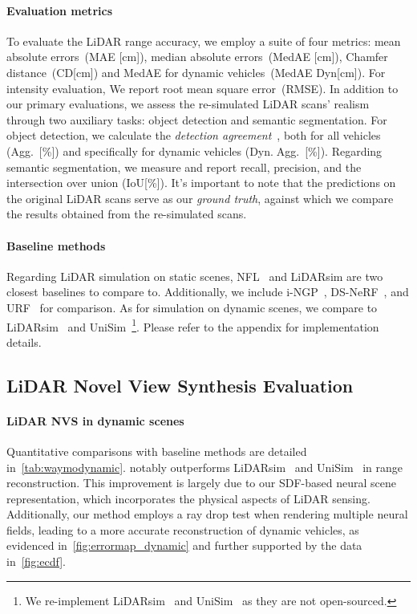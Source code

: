 \paragraph{Evaluation metrics}\label{sec:metrics}
To evaluate the LiDAR range accuracy, we employ a suite of four metrics: mean absolute errors~(MAE [cm]), median absolute errors~(MedAE [cm]), Chamfer distance~(CD[cm]) and MedAE for dynamic vehicles~(MedAE Dyn[cm]). For intensity evaluation, We report root mean square error~(RMSE).
%
In addition to our primary evaluations, we assess the re-simulated LiDAR scans' realism through two auxiliary tasks: object detection and semantic segmentation. For object detection, we calculate the \textit{detection agreement}~\cite{manivasagam2020lidarsim}, both for all vehicles (Agg.~[\%]) and specifically for dynamic vehicles (Dyn.$\;$Agg.~[\%]). Regarding semantic segmentation, we measure and report recall, precision, and the intersection over union (IoU[\%]). It's important to note that the predictions on the original LiDAR scans serve as our \textit{ground truth}, against which we compare the results obtained from the re-simulated scans.




\paragraph{Baseline methods}
Regarding LiDAR simulation on static scenes, NFL~\cite{Huang2023nfl} and LiDARsim\cite{manivasagam2020lidarsim} are two closest baselines to compare to. Additionally, we include i-NGP~\cite{mueller2022instant}, DS-NeRF~\cite{kangle2021dsnerf}, and URF~\cite{rematas2022urban} for comparison. As for simulation on dynamic scenes, we compare to LiDARsim~\cite{manivasagam2020lidarsim} and UniSim~\cite{yang2023unisim}\footnote{We re-implement LiDARsim~\cite{lee2015lidar} and UniSim~\cite{yang2023unisim} as they are not open-sourced.}. Please refer to the appendix for implementation details.






\subsection{LiDAR Novel View Synthesis Evaluation} \label{sec:lidar_eval}
\paragraph{LiDAR NVS in dynamic scenes}
Quantitative comparisons with baseline methods are detailed in~\cref{tab:waymodynamic}. \dynfl notably outperforms LiDARsim~\cite{manivasagam2020lidarsim} and UniSim~\cite{yang2023unisim} in range reconstruction. This improvement is largely due to our SDF-based neural scene representation, which incorporates the physical aspects of LiDAR sensing. Additionally, our method employs a ray drop test when rendering multiple neural fields, leading to a more accurate reconstruction of dynamic vehicles, as evidenced in~\cref{fig:errormap_dynamic} and further supported by the data in~\cref{fig:ecdf}.


